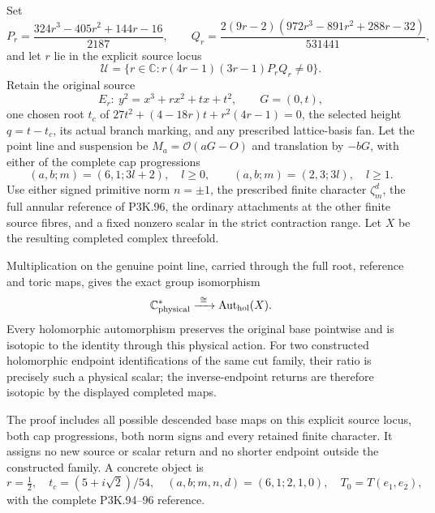 \begin{theorem}\label{night:P3K.109}
Set
\[
 P_r=\frac{324r^3-405r^2+144r-16}{2187},\qquad
 Q_r=\frac{2(9r-2)(972r^3-891r^2+288r-32)}{531441},
\]
and let \(r\) lie in the explicit source locus
\[
 \mathcal U=\{r\in\mathbb C:r(4r-1)(3r-1)P_rQ_r\ne0\}.
\]
Retain the original source
\[
 E_r:\ y^2=x^3+rx^2+tx+t^2,\qquad G=(0,t),
\]
one chosen root \(t_c\) of
\(27t^2+(4-18r)t+r^2(4r-1)=0\), the selected height
\(q=t-t_c\), its actual branch marking, and any prescribed
lattice-basis fan. Let the point line and suspension be
\(M_a=\mathcal O(aG-O)\) and translation by \(-bG\), with
either of the complete cap progressions
\[
 (a,b;m)=(6,1;3l+2),\quad l\ge0,
 \qquad
 (a,b;m)=(2,3;3l),\quad l\ge1.
\]
Use either signed primitive norm \(n=\pm1\), the prescribed finite
character \(\zeta_m^d\), the full annular reference of P3K.96,
the ordinary attachments at the other finite source fibres, and a
fixed nonzero scalar in the strict contraction range. Let \(X\)
be the resulting completed complex threefold.

Multiplication on the genuine point line, carried through the full
root, reference and toric maps, gives the exact group isomorphism
\[
       \mathbb C^*_{\rm physical}
          \xrightarrow{\ \cong\ }\operatorname{Aut}_{\rm hol}(X).
\]
Every holomorphic automorphism preserves the original base pointwise
and is isotopic to the identity through this physical action. For
two constructed holomorphic endpoint identifications of the same
cut family, their ratio is precisely such a physical scalar; the
inverse-endpoint returns are therefore isotopic by the displayed
completed maps.

The proof includes all possible descended base maps on this explicit
source locus, both cap progressions, both norm signs and every
retained finite character. It assigns no new source or scalar return
and no shorter endpoint outside the constructed family. A concrete
object is
\[
 r=\tfrac12,\quad t_c=(5+i\sqrt2)/54,\quad
 (a,b;m,n,d)=(6,1;2,1,0),\quad T_0=T(e_1,e_2),
\]
with the complete P3K.94--96 reference.
\end{theorem}
